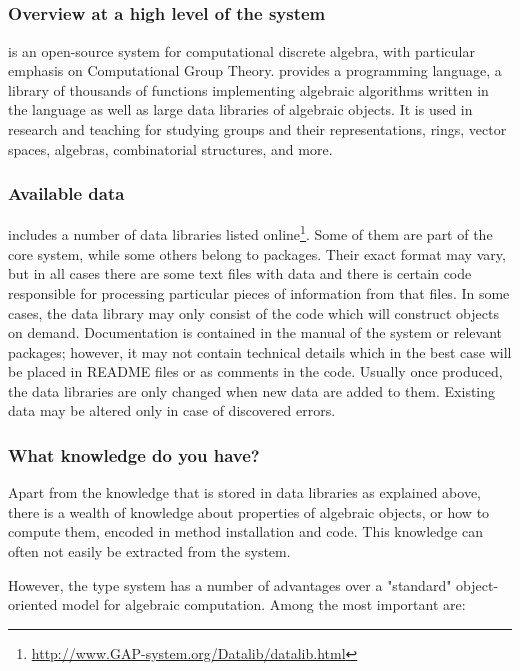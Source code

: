 \subsection{\GAP}
\subsubsection{Overview at a high level of the \GAP system}

\GAP \cite{gap} is an open-source system for computational discrete algebra, with particular emphasis on Computational Group Theory. \GAP provides a programming language, a library of thousands of functions implementing algebraic algorithms written in the \GAP language as well as large data libraries of algebraic objects. It is used in research and teaching for studying groups and their representations, rings, vector spaces, algebras, combinatorial structures, and more.

\subsubsection{Available data}
\GAP includes a number of data libraries listed online\footnote{\url{http://www.GAP-system.org/Datalib/datalib.html}}. Some of them are part of the core \GAP system, while some others belong to \GAP packages. Their exact format may vary, but in all cases there are some text files with data and there is certain code responsible for processing particular pieces of information from that files. In some cases, the data library may only consist of the \GAP code which will construct \GAP objects on demand. Documentation is contained in the manual of the \GAP system or relevant packages; however, it may not contain technical details which in the best case will be placed in README files or as comments in the code. Usually once produced, the data libraries are only changed when new data are added to them. Existing data may be altered only in case of discovered errors.

\subsubsection{What knowledge do you have?}
Apart from the knowledge that is stored in data libraries as explained above, there is a wealth of knowledge about properties of algebraic objects, or how to compute them, encoded in method installation and code. This knowledge can often not easily be extracted from the system.

However, the \GAP type system has a number of advantages over a "standard" object-oriented model for algebraic computation. Among the most important are:

